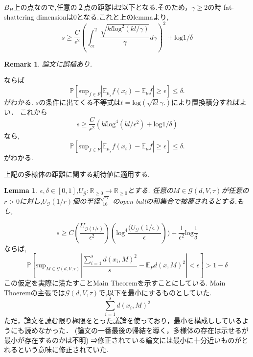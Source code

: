 \documentclass{ujarticle}
\newtheorem{lem}[thm]{Lemma}
\newtheorem*{rem}{Remark}
\begin{document}
$B_H$上の点なので,任意の２点の距離は2以下となる.そのため，$\gamma \ge 2$の時
fat-shattering dimensionは0となる.これと上のlemmaより,
\begin{equation*}
 s \ge \frac{C}{\epsilon^2} (\int_{c \epsilon}^2 \frac{\sqrt{kl \mathrm{log}^2 (kl/\gamma)}}{\gamma}d \gamma)^2 + \mathrm{log}1/\delta
\end{equation*}
\begin{rem}
 論文に誤植あり.
\end{rem}
ならば
\begin{equation*}
 \mathbb{P}[ \mathrm{sup}_{f \in F} |\mathbb{E}_{\mu_s}f(x_i) -\mathbb{E}_{\mu}f|  \ge \epsilon] \le \delta.
\end{equation*}
がわかる.
$s$の条件に出てくる不等式は$t= \mathrm{log}(\sqrt{kl}{\gamma}.)$により置換積分すればよい．
これから
\begin{equation*}
  s \ge \frac{C}{\epsilon^2}(kl \mathrm{log}^4(kl/\epsilon^2) + \mathrm{log}1/\delta)
\end{equation*}
なら,
\begin{equation*}
 \mathbb{P}[ \mathrm{sup}_{f \in F} |\mathbb{E}_{\mu_s}f(x_i) -\mathbb{E}_{\mu}f|  \ge \epsilon] \le \delta.
\end{equation*}
がわかる.

上記の多様体の距離に関する期待値に適用する.
\begin{lem}
\label{mfdvar}
$\epsilon,\delta \in [0,1]$,$U_{\mathcal{G}}:\mathbb{R}_{\ge 0} \to \mathbb{R}_{\ge 0}$とする.
任意の$M \in \mathcal{G}(d,V,\tau)$が任意の$r >0$に対し,$U_{\mathcal{G}}(1/r)$個の半径$\frac{\sqrt{r \tau}}{16}$
のopen ballの和集合で被覆されるとする.もし,
\end{lem}
\begin{equation*}
 s \ge C (\frac{U_{\mathcal{G}(1/\epsilon) }}{\epsilon^2})(\mathrm{log}^4 \frac{(U_{\mathcal{G}}(1/\epsilon)}{\epsilon})) + \frac{1}{\epsilon^2}
 \mathrm{log}\frac{1}{\delta}
\end{equation*}
ならば,
\begin{equation*}
 \mathbb{P}[\mathrm{sup}_{M \in \mathcal{G}(d,V,\tau)} | \frac{\sum_{i=1}^s d(x_i,M)^2}{s} - \mathbb{E}_Pd(x,M)^2 | < \epsilon ]  > 1 - \delta
\end{equation*}
この仮定を実際に満たすことMain Theoremを示すことにしている.
Main Thoeremの主張では$\mathcal{G}(d,V,\tau)$で,以下を最小にするものとしていた.
\begin{equation*}
 \sum_{i=1}^sd(x_i,M)^2
\end{equation*}
ただ，論文を読む限り極限をとった議論を使っており，最小を構成ししているようにも読めなかった．
(論文の一番最後の帰結を導く，多様体の存在は示せるが最小が存在するのかは不明)
⇒修正されている論文には最小に十分近いものがとれるという意味に修正されていた.
\end{document}
